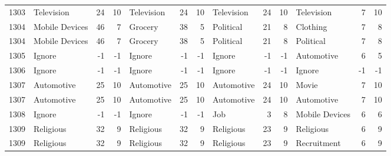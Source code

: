 \begin{figure}[htbp]
\begin{tabular}{rlrrlrrlrrlrr}
    1303  & Television & 24    & 10    & Television & 24    & 10    & Television & 24    & 10    & Television & 7     & 10 \\
    1304  & Mobile Devices & 46    & 7     & Grocery & 38    & 5     & Political & 21    & 8     & Clothing & 7     & 8 \\
    1304  & Mobile Devices & 46    & 7     & Grocery & 38    & 5     & Political & 21    & 8     & Political & 7     & 8 \\
    1305  & Ignore & -1    & -1    & Ignore & -1    & -1    & Ignore & -1    & -1    & Automotive & 6     & 5 \\
    1306  & Ignore & -1    & -1    & Ignore & -1    & -1    & Ignore & -1    & -1    & Ignore & -1    & -1 \\
    1307  & Automotive & 25    & 10    & Automotive & 25    & 10    & Automotive & 24    & 10    & Movie & 7     & 10 \\
    1307  & Automotive & 25    & 10    & Automotive & 25    & 10    & Automotive & 24    & 10    & Automotive & 7     & 10 \\
    1308  & Ignore & -1    & -1    & Ignore & -1    & -1    & Job   & 3     & 8     & Mobile Devices & 6     & 6 \\
    1309  & Religious & 32    & 9     & Religious & 32    & 9     & Religious & 23    & 9     & Religious & 6     & 9 \\
    1309  & Religious & 32    & 9     & Religious & 32    & 9     & Religious & 23    & 9     & Recruitment & 6     & 9 \\
    \end{tabular}%
  \label{fig:tableSegment}%
\end{figure}%
